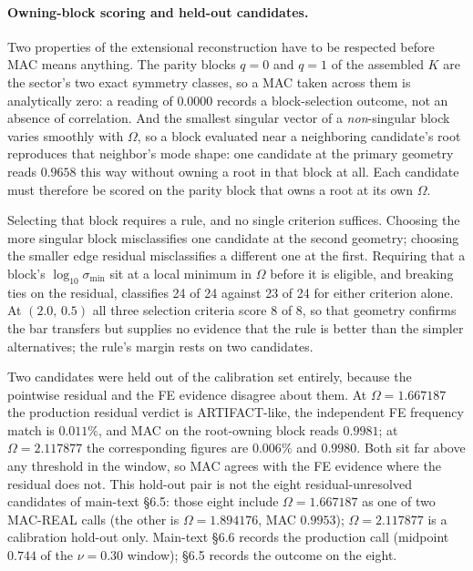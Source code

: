 \documentclass[11pt]{article}
\begin{document}
\paragraph{Owning-block scoring and held-out candidates.}
Two properties of the extensional reconstruction have to be respected
before MAC means anything. The parity blocks $q{=}0$ and $q{=}1$ of the
assembled $K$ are the sector's two exact symmetry classes, so a MAC
taken across them is analytically zero: a reading of $0.0000$ records a
block-selection outcome, not an absence of correlation. And the smallest
singular vector of a \emph{non}-singular block varies smoothly with
$\Omega$, so a block evaluated near a neighboring candidate's root
reproduces that neighbor's mode shape: one candidate at the primary
geometry reads $0.9658$ this way without owning a root in that block at
all. Each candidate must therefore be scored on the parity block that
owns a root at its own $\Omega$.

Selecting that block requires a rule, and no single criterion suffices.
Choosing the more singular block misclassifies one candidate at the
second geometry; choosing the smaller edge residual misclassifies a
different one at the first. Requiring that a block's
$\log_{10}\sigma_{\min}$ sit at a local minimum in $\Omega$ before it is
eligible, and breaking ties on the residual, classifies 24 of 24 against
23 of 24 for either criterion alone. At $(2.0,\,0.5)$ all three
selection criteria score 8 of 8, so that geometry confirms the bar
transfers but supplies no evidence that the rule is better than the
simpler alternatives; the rule's margin rests on two candidates.

Two candidates were held out of the calibration set entirely, because
the pointwise residual and the FE evidence disagree about them. At
$\Omega=1.667187$ the production residual verdict is ARTIFACT-like, the
independent FE frequency match is $0.011\%$, and MAC on the root-owning
block reads $0.9981$; at $\Omega=2.117877$ the corresponding figures are
$0.006\%$ and $0.9980$. Both sit far above any threshold in the window,
so MAC agrees with the FE evidence where the residual does not.
This hold-out pair is not the eight residual-unresolved candidates of
main-text \S6.5: those eight include $\Omega=1.667187$ as one of two
MAC-REAL calls (the other is $\Omega=1.894176$, MAC $0.9953$);
$\Omega=2.117877$ is a calibration hold-out only. Main-text \S6.6
records the production call (midpoint $0.744$ of the $\nu=0.30$
window); \S6.5 records the outcome on the eight.
\end{document}
